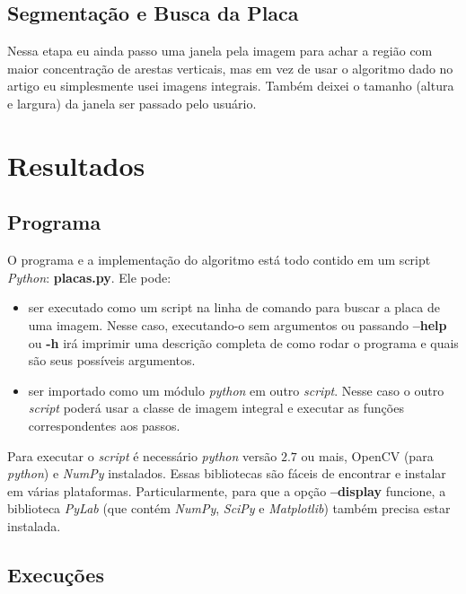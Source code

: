 \subsection{Segmentação e Busca da Placa}
Nessa etapa eu ainda passo uma janela pela imagem para achar a região com maior concentração de arestas
verticais, mas em vez de usar o algoritmo dado no artigo eu simplesmente usei imagens integrais.
Também deixei o tamanho (altura e largura) da janela ser passado pelo usuário. 

\section{Resultados}
\subsection{Programa}
O programa e a implementação do algoritmo está todo contido em um script \emph{Python}:
\textbf{placas.py}. Ele pode:
\begin{itemize}
  \item ser executado como um script na linha de comando para buscar a placa de uma imagem. 
    Nesse caso, executando-o sem argumentos ou passando \textbf{--help} ou \textbf{-h} irá
    imprimir uma descrição completa de como rodar o programa e quais são seus possíveis argumentos.
  \item ser importado como um módulo \emph{python} em outro \textit{script}. Nesse caso o outro \textit{script}
    poderá usar a classe de imagem integral e executar as funções correspondentes aos passos.
\end{itemize}

Para executar o \textit{script} é necessário \emph{python} versão $2.7$ ou mais, OpenCV (para \emph{python})
e \emph{NumPy} instalados. Essas bibliotecas são fáceis de encontrar e instalar em várias plataformas. 
Particularmente, para que a opção \textbf{--display} funcione, a biblioteca \emph{PyLab} (que contém
\emph{NumPy}, \emph{SciPy} e \emph{Matplotlib}) também precisa estar instalada.

\subsection{Execuções}

